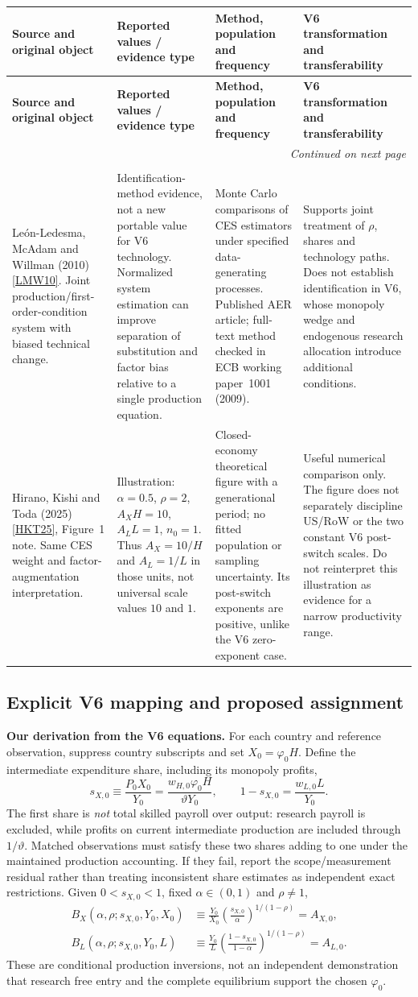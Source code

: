 \documentclass[10pt,a4paper,landscape]{article}
\makeatletter
\newcommand{\src}[1]{\hyperlink{ref:#1}{\textsf{[#1]}}}
\newenvironment{evidence}{%
\fontsize{9.4}{10.9}\selectfont\setlength{\parskip}{2pt}
\begin{longtable}{@{}P{\dimexpr .22\textwidth-7.5pt\relax}P{\dimexpr .24\textwidth-7.5pt\relax}P{\dimexpr .25\textwidth-7.5pt\relax}P{\dimexpr .29\textwidth-7.5pt\relax}@{}}
\toprule\rowcolor{tablehead}\textbf{Source and original object} & \textbf{Reported values / evidence type} & \textbf{Method, population and frequency} & \textbf{V6 transformation and transferability}\\\midrule
\endfirsthead
\toprule\rowcolor{tablehead}\textbf{Source and original object} & \textbf{Reported values / evidence type} & \textbf{Method, population and frequency} & \textbf{V6 transformation and transferability}\\\midrule
\endhead
\midrule\multicolumn{4}{r}{\footnotesize\itshape Continued on next page}\\\endfoot
\bottomrule\endlastfoot
}{\end{longtable}}
\makeatother
\begin{document}
\begin{evidence}
\\[5pt]
León-Ledesma, McAdam and Willman (2010) \src{LMW10}.
Joint production/first-order-condition system with biased technical change.
&
Identification-method evidence, not a new portable value for V6 technology.
Normalized system estimation can improve separation of substitution and factor bias
relative to a single production equation.
&
Monte Carlo comparisons of CES estimators under specified data-generating processes.
Published AER article; full-text method checked in ECB working paper~1001 (2009).
&
Supports joint treatment of $\rho$, shares and technology paths.
Does not establish identification in V6, whose monopoly wedge and endogenous research
allocation introduce additional conditions.
\\[5pt]
Hirano, Kishi and Toda (2025) \src{HKT25}, Figure~1 note.
Same CES weight and factor-augmentation interpretation.
&
Illustration: $\alpha=0.5$, $\rho=2$, $A_XH=10$, $A_LL=1$, $n_0=1$.
Thus $A_X=10/H$ and $A_L=1/L$ in those units, not universal scale values $10$ and $1$.
&
Closed-economy theoretical figure with a generational period;
no fitted population or sampling uncertainty.
Its post-switch exponents are positive, unlike the V6 zero-exponent case.
&
Useful numerical comparison only. The figure does not separately discipline
US/RoW or the two constant V6 post-switch scales.
Do not reinterpret this illustration as evidence for a narrow productivity range.
\\[5pt]
\end{evidence}

\clearpage
\subsection{Explicit V6 mapping and proposed assignment}

\textbf{Our derivation from the V6 equations.}
For each country and reference observation, suppress country subscripts and set
$X_0=\varphi_0H$. Define the intermediate expenditure share, including its monopoly profits,
\[
s_{X,0}\equiv\frac{P_0X_0}{Y_0}
=\frac{w_{H,0}\varphi_0H}{\vartheta Y_0},
\qquad 1-s_{X,0}=\frac{w_{L,0}L}{Y_0}.
\]
The first share is \emph{not} total skilled payroll over output: research payroll is excluded,
while profits on current intermediate production are included through $1/\vartheta$.
Matched observations must satisfy these two shares adding to one under the maintained
production accounting. If they fail, report the scope/measurement residual rather than
treating inconsistent share estimates as independent exact restrictions.
Given $0<s_{X,0}<1$, fixed $\alpha\in(0,1)$ and $\rho\ne1$,
\begin{align}
B_X(\alpha,\rho;s_{X,0},Y_0,X_0)
&\equiv \frac{Y_0}{X_0}
 \left(\frac{s_{X,0}}{\alpha}\right)^{1/(1-\rho)}
= A_{X,0}, \label{eq:bx}\\
B_L(\alpha,\rho;s_{X,0},Y_0,L)
&\equiv \frac{Y_0}{L}
 \left(\frac{1-s_{X,0}}{1-\alpha}\right)^{1/(1-\rho)}
= A_{L,0}. \label{eq:bl}
\end{align}
These are conditional production inversions, not an independent demonstration that
research free entry and the complete equilibrium support the chosen $\varphi_0$.
\end{document}
